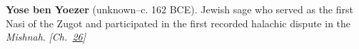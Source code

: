 \textbf{Yose ben Yoezer} (unknown–c. 162 BCE). Jewish sage who served as the first Nasi of the Zugot and participated in the first recorded halachic dispute in the \emph{Mishnah}. \emph{[Ch.~\hyperref[ch:jewishcalendar]{26}]}

